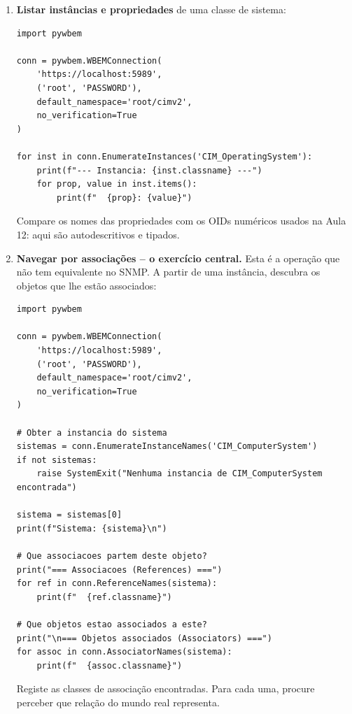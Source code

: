 \documentclass[11pt,a4paper]{article}
\begin{document}
\begin{enumerate}[label=\arabic*.]
\begin{lstlisting}
print("=== Classes CIM disponiveis (root/cimv2) ===")
for cls in sorted(conn.EnumerateClassNames()):
    print(cls)
\end{lstlisting}
\begin{lstlisting}
$ ~/wbem-env/bin/python explorar_cim.py
\end{lstlisting}

  \item \textbf{Listar instâncias e propriedades} de uma classe de sistema:
\begin{lstlisting}
import pywbem

conn = pywbem.WBEMConnection(
    'https://localhost:5989',
    ('root', 'PASSWORD'),
    default_namespace='root/cimv2',
    no_verification=True
)

for inst in conn.EnumerateInstances('CIM_OperatingSystem'):
    print(f"--- Instancia: {inst.classname} ---")
    for prop, value in inst.items():
        print(f"  {prop}: {value}")
\end{lstlisting}
  Compare os nomes das propriedades com os OIDs numéricos usados na Aula 12: aqui são autodescritivos e tipados.

  \item \textbf{Navegar por associações -- o exercício central.} Esta é a operação que não tem equivalente no SNMP. A partir de uma instância, descubra os objetos que lhe estão associados:
\begin{lstlisting}
import pywbem

conn = pywbem.WBEMConnection(
    'https://localhost:5989',
    ('root', 'PASSWORD'),
    default_namespace='root/cimv2',
    no_verification=True
)

# Obter a instancia do sistema
sistemas = conn.EnumerateInstanceNames('CIM_ComputerSystem')
if not sistemas:
    raise SystemExit("Nenhuma instancia de CIM_ComputerSystem encontrada")

sistema = sistemas[0]
print(f"Sistema: {sistema}\n")

# Que associacoes partem deste objeto?
print("=== Associacoes (References) ===")
for ref in conn.ReferenceNames(sistema):
    print(f"  {ref.classname}")

# Que objetos estao associados a este?
print("\n=== Objetos associados (Associators) ===")
for assoc in conn.AssociatorNames(sistema):
    print(f"  {assoc.classname}")
\end{lstlisting}
  Registe as classes de associação encontradas. Para cada uma, procure perceber que relação do mundo real representa.


\end{enumerate}
\end{document}
